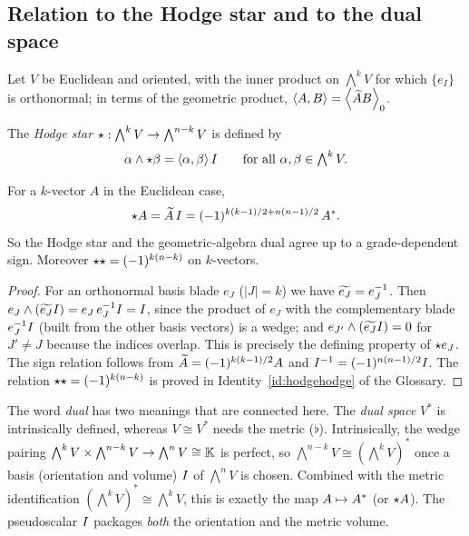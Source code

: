 \subsection{Relation to the Hodge star and to the dual space}

Let $V$ be Euclidean and oriented, with the inner product on $\bigwedge^kV$ for which $\{e_I\}$ is orthonormal; in terms of the geometric product, $\langle A,B\rangle=\left\langle \widetilde{A}B \right\rangle_{0}$.

\begin{definition}
The \emph{Hodge star} $\star:\bigwedge^kV\to\bigwedge^{n-k}V$ is defined by
\[
 \alpha\wedge\star\beta=\langle\alpha,\beta\rangle\,I\qquad\text{for all }\alpha,\beta\in\textstyle\bigwedge^kV .
\]
\end{definition}

\begin{theorem}\label{thm:hodgeGA}
For a $k$-vector $A$ in the Euclidean case,
\[
 \star A=\widetilde{A}\,I=(-1)^{k(k-1)/2+n(n-1)/2}\,A^{\ast} .
\]
So the Hodge star and the geometric-algebra dual agree up to a grade-dependent sign. Moreover $\star\star=(-1)^{k(n-k)}$ on $k$-vectors.
\end{theorem}
\begin{proof}
For an orthonormal basis blade $e_J$ ($|J|=k$) we have $\widetilde{e_J}=e_J^{-1}$. Then $e_J\wedge(\widetilde{e_J}I)=e_J\,e_J^{-1}I=I$, since the product of $e_J$ with the complementary blade $e_J^{-1}I$ (built from the other basis vectors) is a wedge; and $e_{J'}\wedge(\widetilde{e_J}I)=0$ for $J'\neq J$ because the indices overlap. This is precisely the defining property of $\star e_J$. The sign relation follows from $\widetilde{A}=(-1)^{k(k-1)/2}A$ and $I^{-1}=(-1)^{n(n-1)/2}I$.
The relation $\star\star=(-1)^{k(n-k)}$ is proved in Identity~\ref{id:hodgehodge} of the Glossary.%
\end{proof}

\begin{remark}
The word \emph{dual} has two meanings that are connected here. The \emph{dual space} $V^*$ is intrinsically defined, whereas $V\cong V^*$ needs the metric ($\flat$). Intrinsically, the wedge pairing $\bigwedge^kV\times\bigwedge^{n-k}V\to\bigwedge^nV\cong\mathbb{K}$ is perfect, so $\bigwedge^{n-k}V\cong(\bigwedge^kV)^*$ once a basis (orientation and volume) $I$ of $\bigwedge^nV$ is chosen. Combined with the metric identification $(\bigwedge^kV)^*\cong\bigwedge^kV$, this is exactly the map $A\mapsto A^{\ast}$ (or $\star A$). The pseudoscalar $I$ packages \emph{both} the orientation and the metric volume.
\end{remark}


